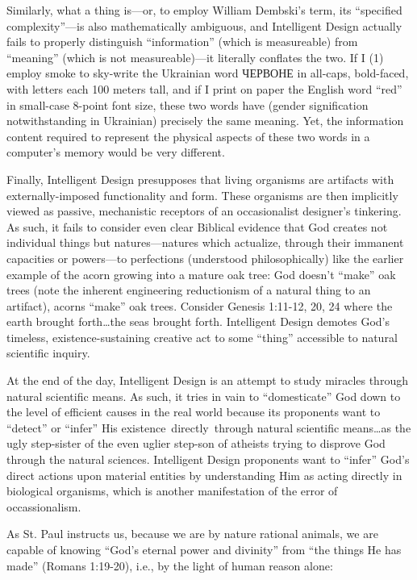 Similarly, what a thing is---or, to employ William Dembski’s term, its ``specified complexity''---is also mathematically ambiguous, and Intelligent Design actually fails to properly distinguish ``information'' (which is measureable) from ``meaning'' (which is not measureable)---it literally conflates the two. If I (1) employ smoke to sky-write the Ukrainian word ЧЕРВОНЕ in all-caps, bold-faced, with letters each 100 meters tall, and if I print on paper the English word ``red'' in small-case 8-point font size, these two words have (gender signification notwithstanding in Ukrainian) precisely the same meaning. Yet, the information content required to represent the physical aspects of these two words in a computer’s memory would be very different.

Finally, Intelligent Design presupposes that living organisms are artifacts with externally-imposed functionality and form. These organisms are then implicitly viewed as passive, mechanistic receptors of an occasionalist designer’s tinkering. As such, it fails to consider even clear Biblical evidence that God creates not individual things but natures---natures which actualize, through their immanent capacities or powers---to perfections (understood philosophically) like the earlier example of the acorn growing into a mature oak tree: God doesn’t ``make'' oak trees (note the inherent engineering reductionism of a natural thing to an artifact), acorns ``make'' oak trees. Consider Genesis 1:11-12, 20, 24 where the earth brought forth\ldots the seas brought forth. Intelligent Design demotes God’s timeless, existence-sustaining creative act to some ``thing'' accessible to natural scientific inquiry.

At the end of the day, Intelligent Design is an attempt to study miracles through natural scientific means. As such, it tries in vain to ``domesticate'' God down to the level of efficient causes in the real world because its proponents want to ``detect'' or ``infer'' His existence directly through natural scientific means\ldots as the ugly step-sister of the even uglier step-son of atheists trying to disprove God through the natural sciences. Intelligent Design proponents want to ``infer'' God’s direct actions upon material entities by understanding Him as acting directly in biological organisms, which is another manifestation of the error of occassionalism.

As St. Paul instructs us, because we are by nature rational animals, we are capable of knowing ``God’s eternal power and divinity'' from ``the things He has made'' (Romans 1:19-20), i.e., by the light of human reason alone:

